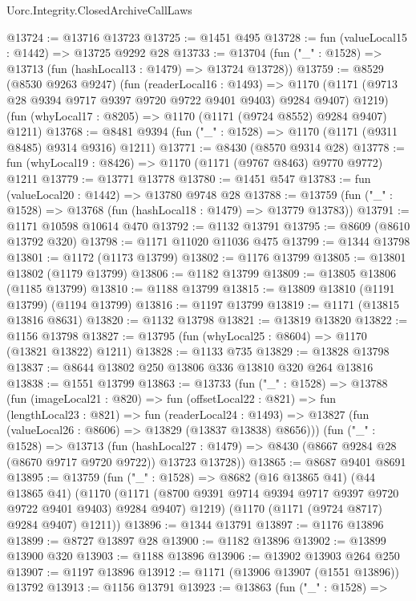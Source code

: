 \begin{lexlean}{Uorc.Integrity.ClosedArchiveCallLaws}
\begin{coremodule}
@13724 := @13716 @13723
@13725 := @1451 @495
@13728 := fun (valueLocal15 : @1442) => @13725 @9292 @28
@13733 := @13704 (fun ("_" : @1528) => @13713 (fun (hashLocal13 : @1479) => @13724 @13728))
@13759 := @8529
    (@8530 @9263 @9247)
    (fun (readerLocal16 : @1493) =>
    @1170 (@1171 (@9713 @28 @9394 @9717 @9397 @9720 @9722 @9401 @9403) @9284 @9407) @1219)
    (fun (whyLocal17 : @8205) => @1170 (@1171 (@9724 @8552) @9284 @9407) @1211)
@13768 := @8481 @9394 (fun ("_" : @1528) => @1170 (@1171 (@9311 @8485) @9314 @9316) @1211)
@13771 := @8430 (@8570 @9314 @28)
@13778 := fun (whyLocal19 : @8426) => @1170 (@1171 (@9767 @8463) @9770 @9772) @1211
@13779 := @13771 @13778
@13780 := @1451 @547
@13783 := fun (valueLocal20 : @1442) => @13780 @9748 @28
@13788 := @13759 (fun ("_" : @1528) => @13768 (fun (hashLocal18 : @1479) => @13779 @13783))
@13791 := @1171 @10598 @10614 @470
@13792 := @1132 @13791
@13795 := @8609 (@8610 @13792 @320)
@13798 := @1171 @11020 @11036 @475
@13799 := @1344 @13798
@13801 := @1172 (@1173 @13799)
@13802 := @1176 @13799
@13805 := @13801 @13802 (@1179 @13799)
@13806 := @1182 @13799
@13809 := @13805 @13806 (@1185 @13799)
@13810 := @1188 @13799
@13815 := @13809 @13810 (@1191 @13799) (@1194 @13799)
@13816 := @1197 @13799
@13819 := @1171 (@13815 @13816 @8631)
@13820 := @1132 @13798
@13821 := @13819 @13820
@13822 := @1156 @13798
@13827 := @13795 (fun (whyLocal25 : @8604) => @1170 (@13821 @13822) @1211)
@13828 := @1133 @735
@13829 := @13828 @13798
@13837 := @8644 @13802 @250 @13806 @336 @13810 @320 @264 @13816
@13838 := @1551 @13799
@13863 := @13733
    (fun ("_" : @1528) =>
    @13788
      (fun (imageLocal21 : @820) =>
      fun (offsetLocal22 : @821) =>
      fun (lengthLocal23 : @821) =>
      fun (readerLocal24 : @1493) =>
      @13827 (fun (valueLocal26 : @8606) => @13829 (@13837 @13838) @8656)))
    (fun ("_" : @1528) =>
    @13713
      (fun (hashLocal27 : @1479) =>
      @8430 (@8667 @9284 @28 (@8670 @9717 @9720 @9722)) @13723 @13728))
@13865 := @8687 @9401 @8691
@13895 := @13759
    (fun ("_" : @1528) =>
    @8682
      (@16 @13865 @41)
      (@44 @13865 @41)
      (@1170
        (@1171 (@8700 @9391 @9714 @9394 @9717 @9397 @9720 @9722 @9401 @9403) @9284 @9407)
        @1219)
      (@1170 (@1171 (@9724 @8717) @9284 @9407) @1211))
@13896 := @1344 @13791
@13897 := @1176 @13896
@13899 := @8727 @13897 @28
@13900 := @1182 @13896
@13902 := @13899 @13900 @320
@13903 := @1188 @13896
@13906 := @13902 @13903 @264 @250
@13907 := @1197 @13896
@13912 := @1171 (@13906 @13907 (@1551 @13896)) @13792
@13913 := @1156 @13791
@13923 := @13863
    (fun ("_" : @1528) =>

\end{coremodule}
\end{lexlean}
